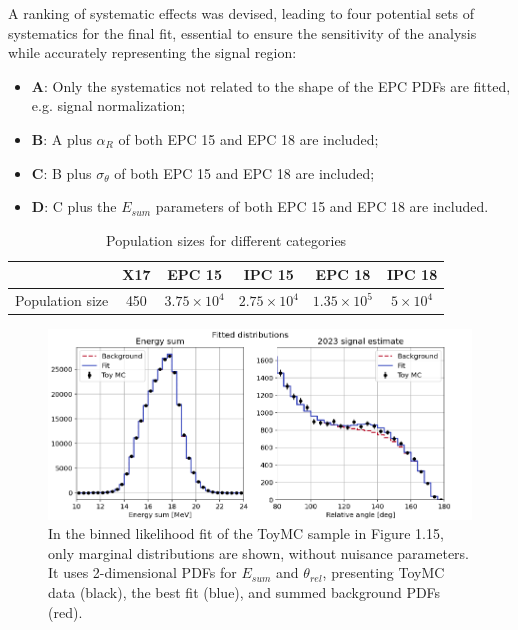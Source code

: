 \begin{refsection}
        \noindent
        A ranking of systematic effects was devised, leading to four potential sets of systematics for the final fit, essential to ensure the sensitivity of the analysis while accurately representing the signal region:
        \begin{itemize}
            \item \textbf{A}: Only the systematics not related to the shape of the EPC PDFs are fitted, e.g. signal normalization;
            \item \textbf{B}: A plus $\alpha_R$ of both EPC 15 and EPC 18 are included;
            \item \textbf{C}: B plus $\sigma_{\theta}$ of both EPC 15 and EPC 18 are included;
            \item \textbf{D}: C plus the $E_{sum}$ parameters of both EPC 15 and EPC 18 are included.
        \end{itemize}

        \begin{table}[htbp]
            \centering
            \caption{Population sizes for different categories}
            \begin{tabular}{|c|c|c|c|c|c|}
                \hline
                & X17 & EPC 15 & IPC 15 & EPC 18 & IPC 18 \\
                \hline
                Population size & 450 & $3.75 \times 10^4$ & $2.75 \times 10^4$ & $1.35 \times 10^5$ & $5 \times 10^4$ \\
                \hline
            \end{tabular}
            \label{tab:X17:populations}
        \end{table}

        \begin{figure}
            \centering
            \includegraphics[width=0.9\linewidth]{Figures//X17//Likelihood/examples-binned.png}
            \caption{In the binned likelihood fit of the ToyMC sample in Figure 1.15, only marginal distributions are shown, without nuisance parameters. It uses 2-dimensional PDFs for $E_{sum}$ and $\theta_{rel}$, presenting ToyMC data (black), the best fit (blue), and summed background PDFs (red).}
            \label{fig:X17:binnedexample}
        \end{figure}


\end{refsection}
